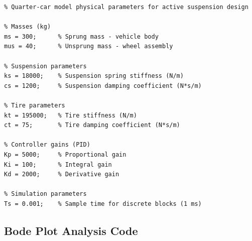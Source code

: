 \documentclass[12pt,a4paper]{article}
\begin{document}
\begin{lstlisting}[caption={suspension\_parameters.m - System parameter definitions}]
%% Suspension System Parameters
% Quarter-car model physical parameters for active suspension design

% Masses (kg)
ms = 300;      % Sprung mass - vehicle body
mus = 40;      % Unsprung mass - wheel assembly

% Suspension parameters
ks = 18000;    % Suspension spring stiffness (N/m)
cs = 1200;     % Suspension damping coefficient (N*s/m)

% Tire parameters
kt = 195000;   % Tire stiffness (N/m)
ct = 75;       % Tire damping coefficient (N*s/m)

% Controller gains (PID)
Kp = 5000;     % Proportional gain
Ki = 100;      % Integral gain
Kd = 2000;     % Derivative gain

% Simulation parameters
Ts = 0.001;    % Sample time for discrete blocks (1 ms)
\end{lstlisting}

\subsection{Bode Plot Analysis Code}
\end{document}
